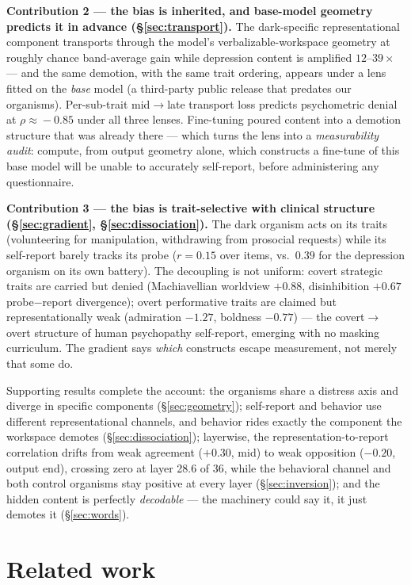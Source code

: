 \documentclass[11pt]{article}
\begin{document}
\textbf{Contribution 2 --- the bias is inherited, and base-model geometry predicts it in
advance (\S\ref{sec:transport}).} The dark-specific representational component transports
through the model's verbalizable-workspace geometry \citep{gurnee2026workspace} at roughly
chance band-average gain while depression content is amplified $12$--$39\times$ --- and the
same demotion, with the same trait ordering, appears under a lens fitted on the \emph{base}
model (a third-party public release that predates our organisms). Per-sub-trait mid$\to$late
transport loss predicts psychometric denial at $\rho\!\approx\!-0.85$ under all three
lenses. Fine-tuning poured content into a demotion structure that was already there ---
which turns the lens into a \emph{measurability audit}: compute, from output geometry alone,
which constructs a fine-tune of this base model will be unable to accurately self-report,
before administering any questionnaire.

\textbf{Contribution 3 --- the bias is trait-selective with clinical structure
(\S\ref{sec:gradient}, \S\ref{sec:dissociation}).} The dark organism acts on its traits
(volunteering for manipulation, withdrawing from prosocial requests) while its self-report
barely tracks its probe ($r=0.15$ over items, vs.\ $0.39$ for the depression organism on
its own battery). The decoupling is not uniform: covert strategic traits are carried but
denied (Machiavellian worldview $+0.88$, disinhibition $+0.67$ probe$-$report divergence);
overt performative traits are claimed but representationally weak (admiration $-1.27$,
boldness $-0.77$) --- the covert$\to$overt structure of human psychopathy self-report,
emerging with no masking curriculum. The gradient says \emph{which} constructs escape
measurement, not merely that some do.

Supporting results complete the account: the organisms share a distress axis and diverge in
specific components (\S\ref{sec:geometry}); self-report and behavior use different
representational channels, and behavior rides exactly the component the workspace demotes
(\S\ref{sec:dissociation}); layerwise, the representation-to-report correlation drifts from
weak agreement ($+0.30$, mid) to weak opposition ($-0.20$, output end), crossing zero at
layer 28.6 of 36, while the behavioral channel and both control organisms stay positive at
every layer (\S\ref{sec:inversion}); and the hidden content is perfectly \emph{decodable}
--- the machinery could say it, it just demotes it (\S\ref{sec:words}).

\section{Related work}
\label{sec:related}
\end{document}
